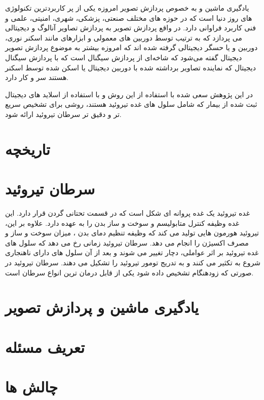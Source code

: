 
یادگیری ماشین و به خصوص پردازش تصویر امروزه یکی از پر کاربردترین تکنولوژی های روز دنیا است که در حوزه های مختلف صنعتی، پزشکی، شهری، امنیتی، علمی و فنی کاربرد فراوانی دارد.
در واقع پردازش تصویر به پردازش تصاویر آنالوگ و دیجیتالی می پردازد که به ترتیب توسط دوربین های معمولی و ابزارهای مانند اسکنر نوری، دوربین و یا حسگر دیجیتالی گرفته شده اند
که امروزه بیشتر به موضوع پردازش تصویر دیجیتال گفته می‌شود که شاخه‌ای از پردازش سیگنال است که با پردازش سیگنال دیجیتال که نماینده تصاویر برداشته شده با دوربین دیجیتال یا اسکن شده توسط اسکنر هستند سر و کار دارد.

در این پژوهش سعی شده با استفاده از این روش و با استفاده از اسلاید های دیجیتال ثبت شده از بیمار که شامل سلول های غده تیروئید هستند، روشی برای تشخیص سریع تر و دقیق تر سرطان تیروئید ارائه شود.

\section{تاریخچه}\label{sec:تاریخچه}

\section{سرطان تیروئید}\label{sec:سرطان-تیروئید}
غده تیروئید یک غده پروانه ای شکل است که در قسمت تحتانی گردن قرار دارد.
این غده وظیفه کنترل متابولیسم و سوخت و ساز بدن را به عهده دارد.
علاوه بر این، تیروئید هورمون هایی تولید می کند که وظیفه تنظیم دمای بدن ، میزان سوخت و ساز و مصرف اکسیژن را انجام می دهد.
سرطان تیروئید زمانی رخ می دهد که سلول های غده تیروئید بر اثر عواملی،  دچار تغییر می شوند و بعد از آن سلول های دارای ناهنجاری شروع به تکثیر می کنند و به تدریج تومور تیروئید را تشکیل می دهند.
سرطان تیروئید در صورتی که زودهنگام تشخیص داده شود یکی از قابل درمان ترین انواع سرطان است.







\section{یادگیری ماشین و پردازش تصویر}\label{sec:یادگیری-ماشین-و-پردازش-تصویر}

\section{تعریف مسئله}\label{sec:تعریف-مسئله2}\label{sec:تعریف-مسئله}

\section{چالش ها}\label{sec:چالش-ها}


